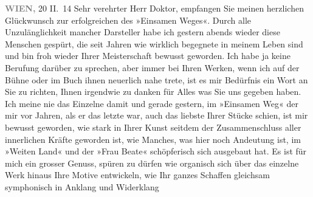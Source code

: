 \pstart
           \raggedleft{}\textcolor{gray}{\textbf{WIEN,}}{ }20 II. 14\pend
           \vspace{0.5em}
\pstart
           Sehr verehrter Herr Doktor, empfangen Sie meinen herzlichen
               Glückwunsch zur erfolgreichen \label{K_L03646-1v}\label{K_L03646-1} des »Einsamen
                  Weges«. Durch alle Unzulänglichkeit mancher Darsteller habe ich
                  gestern abends wieder diese Menschen gespürt, die seit Jahren wie
               wirklich begegnete in meinem Leben sind und bin froh wieder Ihrer Meisterschaft
               bewusst geworden. Ich habe ja keine Berufung darüber zu sprechen, aber immer bei
               Ihren Werken, wenn ich  auf der Bühne oder im
               Buch {\pb}ihnen neuerlich nahe trete, ist es
               mir Bedürfnis ein Wort an Sie zu richten, Ihnen irgendwie zu danken für Alles was Sie
               uns gegeben haben. Ich meine nie das Einzelne damit und gerade gestern,
               im »Einsamen Weg« der mir vor Jahren, als er das
               letzte war, auch das liebste Ihrer Stücke schien, ist mir bewusst geworden, wie stark
               in Ihrer Kunst seitdem der Zusammenschluss aller innerlichen Kräfte geworden ist, wie
               Manches, was hier noch Andeutung ist, im »Weiten
                  Land« und der »Frau Beate« schöpferisch
                   sich ausgebaut hat. Es ist für mich ein grosser
               Genuss, spüren zu dürfen wie organisch sich über das einzelne Werk hinaus Ihre Motive
               entwickeln, wie Ihr ganzes Schaffen gleichsam {\pb}symphonisch in Anklang und Widerklang
